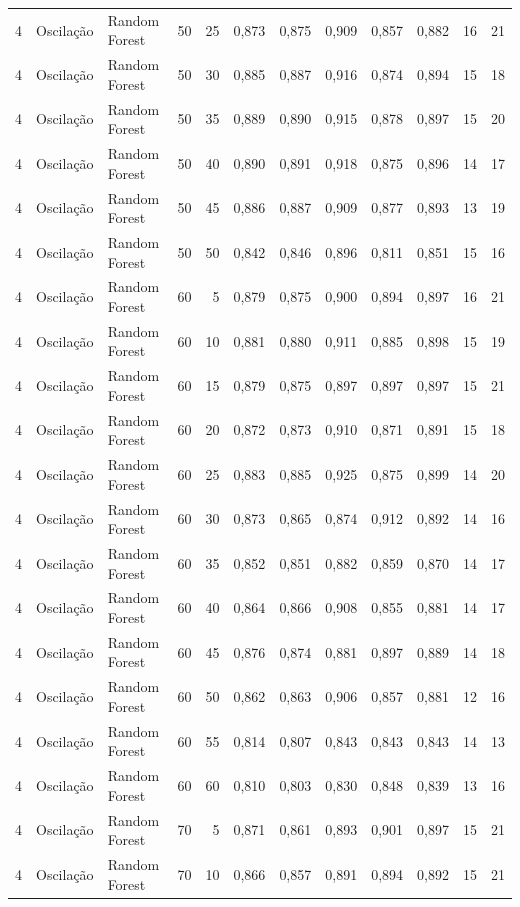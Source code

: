 \begin{longtable}{@{}rllrrrrrrrrr@{}}
4 & Oscilação & Random Forest & 50 & 25 & 0,873 & 0,875 & 0,909 & 0,857 & 0,882 & 16 & 21 \\
4 & Oscilação & Random Forest & 50 & 30 & 0,885 & 0,887 & 0,916 & 0,874 & 0,894 & 15 & 18 \\
4 & Oscilação & Random Forest & 50 & 35 & 0,889 & 0,890 & 0,915 & 0,878 & 0,897 & 15 & 20 \\
4 & Oscilação & Random Forest & 50 & 40 & 0,890 & 0,891 & 0,918 & 0,875 & 0,896 & 14 & 17 \\
4 & Oscilação & Random Forest & 50 & 45 & 0,886 & 0,887 & 0,909 & 0,877 & 0,893 & 13 & 19 \\
4 & Oscilação & Random Forest & 50 & 50 & 0,842 & 0,846 & 0,896 & 0,811 & 0,851 & 15 & 16 \\
4 & Oscilação & Random Forest & 60 & 5 & 0,879 & 0,875 & 0,900 & 0,894 & 0,897 & 16 & 21 \\
4 & Oscilação & Random Forest & 60 & 10 & 0,881 & 0,880 & 0,911 & 0,885 & 0,898 & 15 & 19 \\
4 & Oscilação & Random Forest & 60 & 15 & 0,879 & 0,875 & 0,897 & 0,897 & 0,897 & 15 & 21 \\
4 & Oscilação & Random Forest & 60 & 20 & 0,872 & 0,873 & 0,910 & 0,871 & 0,891 & 15 & 18 \\
4 & Oscilação & Random Forest & 60 & 25 & 0,883 & 0,885 & 0,925 & 0,875 & 0,899 & 14 & 20 \\
4 & Oscilação & Random Forest & 60 & 30 & 0,873 & 0,865 & 0,874 & 0,912 & 0,892 & 14 & 16 \\
4 & Oscilação & Random Forest & 60 & 35 & 0,852 & 0,851 & 0,882 & 0,859 & 0,870 & 14 & 17 \\
4 & Oscilação & Random Forest & 60 & 40 & 0,864 & 0,866 & 0,908 & 0,855 & 0,881 & 14 & 17 \\
4 & Oscilação & Random Forest & 60 & 45 & 0,876 & 0,874 & 0,881 & 0,897 & 0,889 & 14 & 18 \\
4 & Oscilação & Random Forest & 60 & 50 & 0,862 & 0,863 & 0,906 & 0,857 & 0,881 & 12 & 16 \\
4 & Oscilação & Random Forest & 60 & 55 & 0,814 & 0,807 & 0,843 & 0,843 & 0,843 & 14 & 13 \\
4 & Oscilação & Random Forest & 60 & 60 & 0,810 & 0,803 & 0,830 & 0,848 & 0,839 & 13 & 16 \\
4 & Oscilação & Random Forest & 70 & 5 & 0,871 & 0,861 & 0,893 & 0,901 & 0,897 & 15 & 21 \\
4 & Oscilação & Random Forest & 70 & 10 & 0,866 & 0,857 & 0,891 & 0,894 & 0,892 & 15 & 21 \\

\end{longtable}
